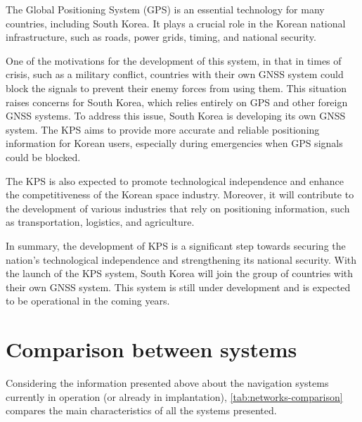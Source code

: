 The Global Positioning System (GPS) is an essential technology for many countries, including South Korea. It plays a crucial role in the Korean national infrastructure, such as roads, power grids, timing, and national security.

One of the motivations for the development of this system, in that in times of crisis, such as a military conflict, countries with their own GNSS system could block the signals to prevent their enemy forces from using them. This situation raises concerns for South Korea, which relies entirely on GPS and other foreign GNSS systems. To address this issue, South Korea is developing its own GNSS system. The KPS aims to provide more accurate and reliable positioning information for Korean users, especially during emergencies when GPS signals could be blocked.

The KPS is also expected to promote technological independence and enhance the competitiveness of the Korean space industry. Moreover, it will contribute to the development of various industries that rely on positioning information, such as transportation, logistics, and agriculture.

In summary, the development of KPS is a significant step towards securing the nation's technological independence and strengthening its national security. With the launch of the KPS system, South Korea will join the group of countries with their own GNSS system. This system is still under development and is expected to be operational in the coming years.

\section{Comparison between systems}

Considering the information presented above about the navigation systems currently in operation (or already in implantation), \autoref{tab:networks-comparison} compares the main characteristics of all the systems presented.

